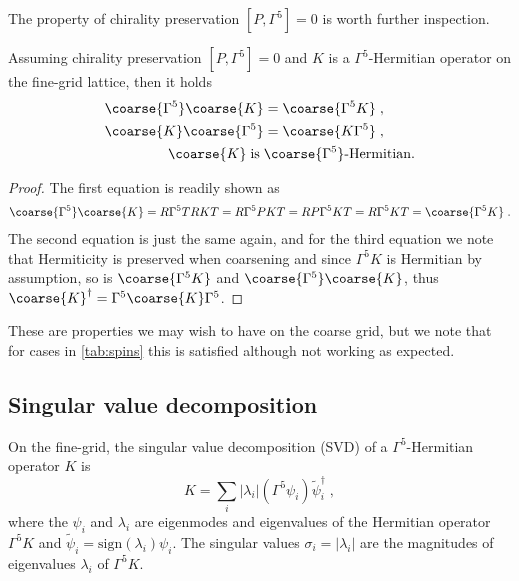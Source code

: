 The property of chirality preservation $[P, \Gamma^{5}]=0$ is worth further inspection.

\begin{lemma} \label{lemma:chirality:preservation:implications}
Assuming chirality preservation $[P, \Gamma^{5}]=0$ and $K$ is a $\Gamma^{5}$-Hermitian operator on the fine-grid lattice, then it holds
\begin{align}
\coarse{\Gamma^{5}} \coarse{K} &= \coarse{\Gamma^{5} K} \;, \\
\coarse{K} \coarse{\Gamma^{5}} &= \coarse{K \Gamma^{5}} \;, \\
\coarse{K} \; \text{is} \; &\coarse{\Gamma^{5}} \text{-Hermitian.}
\end{align}
\end{lemma}

\begin{proof}
The first equation is readily shown as
\begin{align}
\coarse{\Gamma^{5}} \coarse{K} = R \Gamma^{5} T R K T = R \Gamma^{5} P K T = R P \Gamma^{5} K T = R \Gamma^{5} K T = \coarse{\Gamma^{5} K} \;.
\end{align}
The second equation is just the same again, and for the third equation we note that Hermiticity is preserved when coarsening and since $\Gamma^{5} K$ is Hermitian by assumption, so is $\coarse{\Gamma^{5} K}$ and $\coarse{\Gamma^{5}} \coarse{K}$, thus $\coarse{K}^{\dagger} = \Gamma^{5} \coarse{K} \Gamma^{5}$.
\end{proof}

These are properties we may wish to have on the coarse grid, but we note that for cases  in \cref{tab:spins} this is satisfied  although not working as expected.

\subsection{Singular value decomposition}

On the fine-grid, the singular value decomposition (SVD) of a $\Gamma^{5}$-Hermitian operator $K$ is
\begin{equation} \label{eq:svd}
K = \sum_{i} \lvert \lambda_i \rvert (\Gamma^{5} \psi_i) \tilde{\psi}_i^{\dagger} \;,
\end{equation}
where the $\psi_i$ and $\lambda_i$ are eigenmodes and eigenvalues of the Hermitian operator $\Gamma^{5} K$ and $\tilde{\psi}_i = \text{sign}(\lambda_i) \psi_i$.
The singular values $\sigma_i = \lvert \lambda_i \rvert$ are the magnitudes of eigenvalues $\lambda_i$ of $\Gamma^{5} K$.

